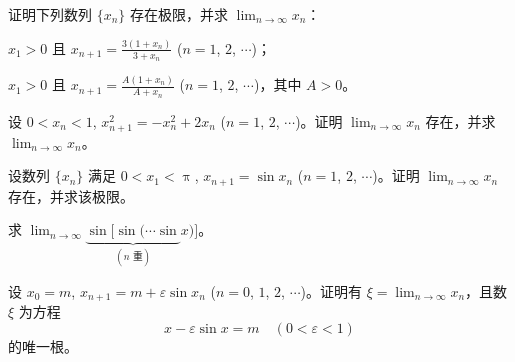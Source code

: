 	\begin{ti}
		证明下列数列 $\{x_n\}$ 存在极限，并求 $\lim_{n \to \infty} x_n$：
		\begin{xiaoti}
			\item $x_1>0$ 且 $x_{n+1} = \frac{3(1+x_n)}{3+x_n}$ ($n=1$, $2$, $\cdots$)；
			\item $x_1>0$ 且 $x_{n+1} = \frac{A(1+x_n)}{A+x_n}$ ($n=1$, $2$, $\cdots$)，其中 $A>0$。
		\end{xiaoti}
	\end{ti}

	\begin{ti}
		设 $0<x_n<1$, $x_{n+1}^2 = -x_n^2 + 2x_n$ ($n=1$, $2$, $\cdots$)。证明 $\lim_{n \to \infty} x_n$ 存在，并求 $\lim_{n \to \infty} x_n$。
	\end{ti}

	\begin{ti}
		设数列 $\{x_n\}$ 满足 $0<x_1<\uppi$, $x_{n+1} = \sin x_n$ ($n=1$, $2$, $\cdots$)。证明 $\lim_{n \to \infty} x_n$ 存在，并求该极限。
		\begin{bianshi}
			求 $\lim_{n \to \infty} \underbrace{\sin[\sin(\cdots \sin}_{(n \text{ 重})} x)]$。
		\end{bianshi}
	\end{ti}

	\begin{ti}
		设 $x_0 = m$, $x_{n+1} = m + \varepsilon \sin x_n$ ($n=0$, $1$, $2$, $\cdots$)。证明有 $\xi = \lim_{n \to \infty} x_n$，且数 $\xi$ 为方程
		\[ x - \varepsilon \sin x = m\quad (0<\varepsilon<1) \]
		的唯一根。
	\end{ti}